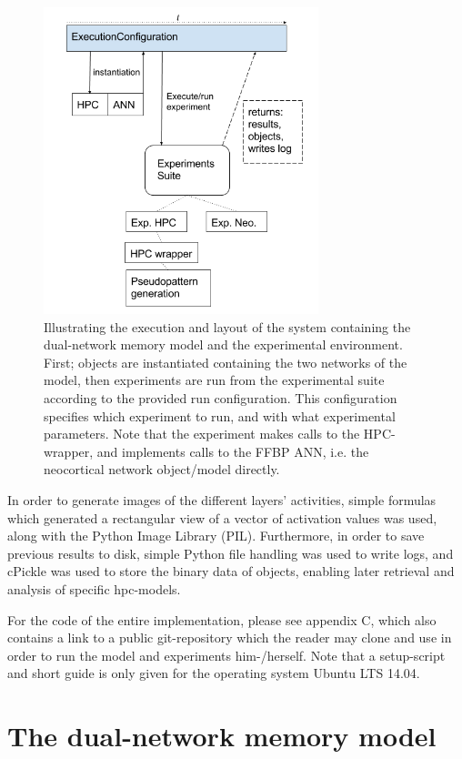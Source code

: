 \begin{figure}
    \centering
    \includegraphics[width=8cm]{fig/ExecutionConfiguration.png}
    \caption{Illustrating the execution and layout of the system containing the dual-network memory model and the experimental environment. First; objects are instantiated containing the two networks of the model, then experiments are run from the experimental suite according to the provided run configuration. This configuration specifies which experiment to run, and with what experimental parameters. Note that the experiment makes calls to the HPC-wrapper, and implements calls to the FFBP ANN, i.e. the neocortical network object/model directly.}
    \label{fig:system_layout}
\end{figure}

In order to generate images of the different layers' activities, simple formulas which generated a rectangular view of a vector of activation values was used, along with the Python Image Library (PIL). Furthermore, in order to save previous results to disk, simple Python file handling was used to write logs, and cPickle was used to store the binary data of objects, enabling later retrieval and analysis of specific hpc-models.

For the code of the entire implementation, please see appendix C, which also contains a link to a public git-repository which the reader may clone and use in order to run the model and experiments him-/herself. Note that a setup-script and short guide is only given for the operating system Ubuntu LTS 14.04.

\section{The dual-network memory model}

